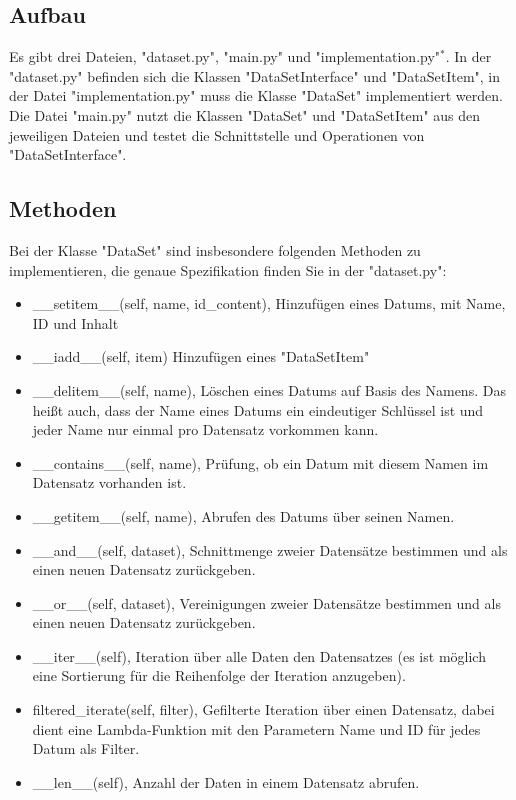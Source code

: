 \documentclass[
	12pt,
	a4paper,
	parskip=full
]{article}
\begin{document}
		\subsection{Aufbau}
			Es gibt drei Dateien, "dataset.py", "main.py" und "implementation.py"$^*$.
			In der "dataset.py" befinden sich die Klassen "DataSetInterface" und "DataSetItem",
			in der Datei "implementation.py" muss die Klasse "DataSet" implementiert werden.
			Die Datei "main.py" nutzt die Klassen "DataSet" und "DataSetItem" aus den jeweiligen Dateien und testet die Schnittstelle und Operationen von "DataSetInterface".\\
		
		\subsection{Methoden}
			Bei der Klasse "DataSet" sind insbesondere folgenden Methoden zu implementieren, die genaue Spezifikation finden Sie in der "dataset.py":\\
			\begin{itemize}
  				\item \_\_setitem\_\_(self, name, id\_content),
					 Hinzufügen eines Datums, mit Name, ID und Inhalt
	  			\item \_\_iadd\_\_(self, item)
					Hinzufügen eines "DataSetItem"
				\item \_\_delitem\_\_(self, name),
					Löschen eines Datums auf Basis des Namens.
					Das heißt auch, dass der Name eines Datums ein eindeutiger Schlüssel ist und jeder Name nur einmal pro Datensatz vorkommen kann.
				\item \_\_contains\_\_(self, name),
					Prüfung, ob ein Datum mit diesem Namen im Datensatz vorhanden ist.
				\item \_\_getitem\_\_(self, name),
					Abrufen des Datums über seinen Namen.\
				\item \_\_and\_\_(self, dataset),
					Schnittmenge zweier Datensätze bestimmen und als einen neuen Datensatz zurückgeben.
				\item \_\_or\_\_(self, dataset),
					Vereinigungen zweier Datensätze bestimmen und als einen neuen Datensatz zurückgeben.
				\item \_\_iter\_\_(self),
					Iteration über alle Daten den Datensatzes (es ist möglich eine Sortierung für die Reihenfolge der Iteration anzugeben).
				\item filtered\_iterate(self, filter),
					Gefilterte Iteration über einen Datensatz, dabei dient eine Lambda-Funktion mit den Parametern Name und ID für jedes Datum als Filter.
				\item \_\_len\_\_(self),
					Anzahl der Daten in einem Datensatz abrufen.
			\end{itemize}
\end{document}

